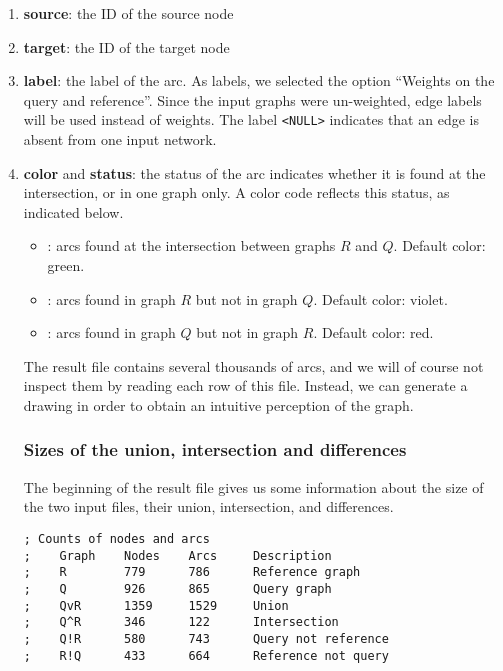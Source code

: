 \begin{enumerate}
\item \textbf{source}: the ID of the source node
  
\item \textbf{target}: the ID of the target node
  
\item \textbf{label}: the label of the arc. As labels, we selected
  the option ``Weights on the query and reference''. Since the
  input graphs were un-weighted, edge labels will be used instead
  of weights. The label \texttt{<NULL>} indicates that an edge is
  absent from one input network.
  
\item \textbf{color} and \textbf{status}: the status of the arc
  indicates whether it is found at the intersection, or in one graph
  only.  A color code reflects this status, as indicated below.
  \begin{itemize}
  \item {}: arcs found at the intersection between graphs $R$
    and $Q$. Default color: green.
  \item {}: arcs found in graph $R$ but not in graph
    $Q$. Default color: violet.
  \item {}: arcs found in graph $Q$ but not in graph
    $R$. Default color: red.
  \end{itemize}

  The result file contains several thousands of arcs, and we will of
  course not inspect them by reading each row of this file. Instead,
  we can generate a drawing in order to obtain an intuitive perception
  of the graph.

\subsubsection{Sizes of the union, intersection and differences}

The beginning of the result file gives us some information about the
size of the two input files, their union, intersection, and
differences.

\begin{footnotesize}
\begin{verbatim}
; Counts of nodes and arcs
;    Graph    Nodes    Arcs     Description
;    R        779      786      Reference graph
;    Q        926      865      Query graph
;    QvR      1359     1529     Union
;    Q^R      346      122      Intersection
;    Q!R      580      743      Query not reference
;    R!Q      433      664      Reference not query
\end{verbatim}
\end{footnotesize}


\end{enumerate}
